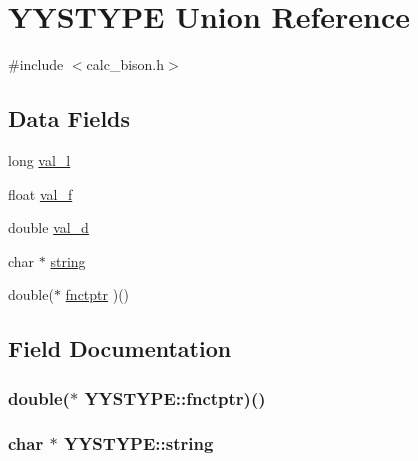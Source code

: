 \hypertarget{unionYYSTYPE}{}\section{Y\+Y\+S\+T\+Y\+P\+E Union Reference}
\label{unionYYSTYPE}


{\ttfamily \#include $<$calc\+\_\+bison.\+h$>$}

\subsection*{Data Fields}
\begin{DoxyCompactItemize}
\item 
long \hyperlink{unionYYSTYPE_a81f209066080f5ffa329c1772b8b70c5}{val\+\_\+l}
\item 
float \hyperlink{unionYYSTYPE_a6f4050b34641ae09204f63c853cb4c92}{val\+\_\+f}
\item 
double \hyperlink{unionYYSTYPE_a61bc717a8d5bde0979541eb670984140}{val\+\_\+d}
\item 
char $\ast$ \hyperlink{unionYYSTYPE_a0138efb4387041e915681aff6dfd68ff}{string}
\item 
double($\ast$ \hyperlink{unionYYSTYPE_a2ede02959c9774fe63cc959095e4a50f}{fnctptr} )()
\end{DoxyCompactItemize}


\subsection{Field Documentation}
\hypertarget{unionYYSTYPE_a2ede02959c9774fe63cc959095e4a50f}{}
\subsubsection[{fnctptr}]{\setlength{\rightskip}{0pt plus 5cm}double($\ast$ Y\+Y\+S\+T\+Y\+P\+E\+::fnctptr)()}\label{unionYYSTYPE_a2ede02959c9774fe63cc959095e4a50f}
\hypertarget{unionYYSTYPE_a0138efb4387041e915681aff6dfd68ff}{}
\subsubsection[{string}]{\setlength{\rightskip}{0pt plus 5cm}char $\ast$ Y\+Y\+S\+T\+Y\+P\+E\+::string}\label{unionYYSTYPE_a0138efb4387041e915681aff6dfd68ff}
\hypertarget{unionYYSTYPE_a61bc717a8d5bde0979541eb670984140}{}
